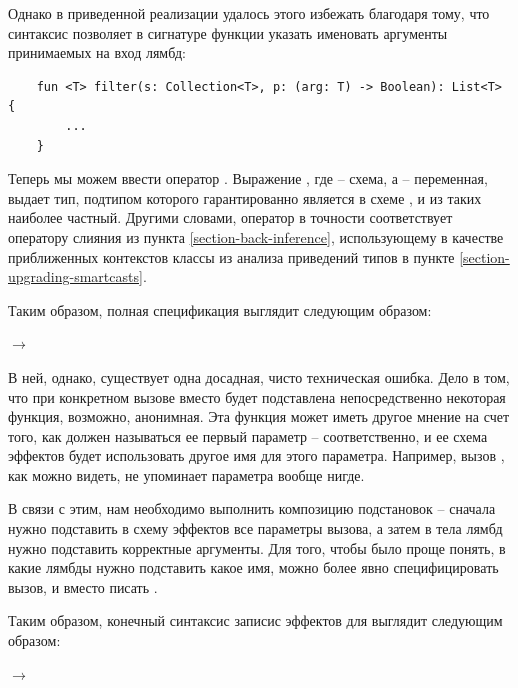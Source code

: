 Однако в приведенной реализации удалось этого избежать благодаря тому, что синтаксис  позволяет в сигнатуре функции указать именовать аргументы принимаемых на вход лямбд:

\begin{verbatim}
	fun <T> filter(s: Collection<T>, p: (arg: T) -> Boolean): List<T> {
		...
	}
\end{verbatim}

Теперь мы можем ввести оператор . Выражение , где  -- схема, а  -- переменная, выдает тип, подтипом которого гарантированно является  в схеме , и из таких наиболее частный. Другими словами, оператор  в точности соответствует оператору слияния из пункта \ref{section-back-inference}, использующему в качестве приближенных контекстов классы  из анализа приведений типов в пункте \ref{section-upgrading-smartcasts}. 

Таким образом, полная спецификация  выглядит следующим образом:

{
	 $\rightarrow$ 
}{}

В ней, однако, существует одна досадная, чисто техническая ошибка. Дело в том, что при конкретном вызове  вместо  будет подставлена непосредственно некоторая функция, возможно, анонимная. Эта функция может иметь другое мнение на счет того, как должен называться ее первый параметр -- соответственно, и ее схема эффектов будет использовать другое имя для этого параметра. Например, вызов , как можно видеть, не упоминает параметра  вообще нигде.

В связи с этим, нам необходимо выполнить композицию подстановок -- сначала нужно подставить в схему эффектов  все параметры вызова, а затем в тела лямбд нужно подставить корректные аргументы. Для того, чтобы было проще понять, в какие лямбды нужно подставить какое имя, можно более явно специфицировать вызов, и вместо  писать .

Таким образом, конечный синтаксис записис эффектов для  выглядит следующим образом:

{
	 $\rightarrow$  
}
{}


